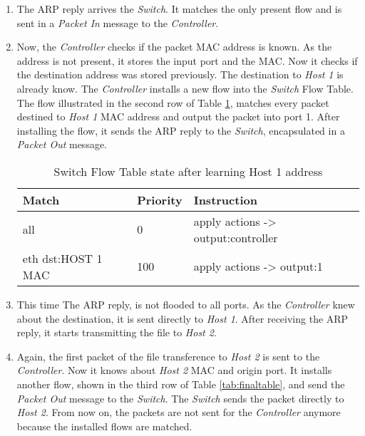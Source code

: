 \begin{enumerate}
\item The ARP reply arrives the \textit{Switch}. It matches the only present flow and is sent in a \textit{Packet In} message to the  \textit{Controller}.   

\item Now, the  \textit{Controller} checks if the packet MAC address is known. As the address is not present, it stores the input port and the MAC. Now it checks if the destination address was stored previously. The destination to \textit{Host 1} is already know. The  \textit{Controller} installs a new flow into the \textit{Switch} Flow Table. The flow illustrated in the second row of Table \ref{tab:secondtable}, matches every packet destined to \textit{Host 1} MAC address and output the packet into port 1. After installing the flow, it sends the ARP reply to the \textit{Switch}, encapsulated in a \textit{Packet Out} message.

\begin{table}[h]
\centering
\caption{Switch Flow Table state after learning Host 1 address}
\label{tab:secondtable}
\begin{tabular}{|l|l|l|}
\hline
\textbf{Match}                 & \textbf{Priority}   & \textbf{Instruction}                              \\ \hline
all                            & 0                   & apply actions -> output:controller                \\ \hline
eth dst:HOST 1 MAC             & 100                 & apply actions -> output:1                         \\ \hline
\end{tabular}
\end{table}

\item This time The ARP reply, is not flooded to all ports. As the  \textit{Controller} knew about the destination, it is sent directly to \textit{Host 1}. After receiving the ARP reply, it starts transmitting the file to \textit{Host 2}.

\item Again, the first packet of the file transference to \textit{Host 2} is sent to the  \textit{Controller}. Now it knows about \textit{Host 2} MAC and origin port. It installs another flow, shown in the third row of Table \ref{tab:finaltable}, and send the \textit{Packet Out} message to the \textit{Switch}. The \textit{Switch} sends the packet directly to \textit{Host 2}. From now on, the packets are not  sent for the \textit{Controller} anymore because the installed flows are matched. 


\end{enumerate}
